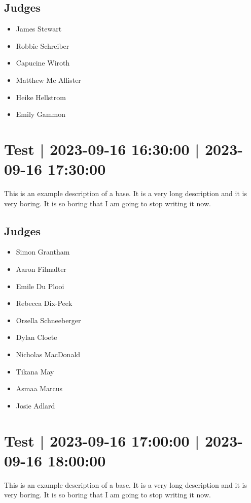 \documentclass[10pt]{article}
\begin{document}
	\subsection*{Judges}
	\begin{itemize}

			\item James Stewart
			\item Robbie Schreiber
			\item Capucine Wiroth
			\item Matthew Mc Allister
			\item Heike Hellstrom
			\item Emily Gammon
		\end{itemize}

			\setcounter{section}{16}
	\section{Test | 2023-09-16 16:30:00 | 2023-09-16 17:30:00}
	This is an example description of a base. It is a very long description and it is very boring. It is so boring that I am going to stop writing it now.

	\subsection*{Judges}
	\begin{itemize}

			\item Simon Grantham
			\item Aaron Filmalter
			\item Emile Du Plooi
			\item Rebecca Dix-Peek
			\item Orsella Schneeberger
			\item Dylan Cloete
			\item Nicholas MacDonald
			\item Tikana May
			\item Asmaa Marcus
			\item Josie Adlard
		\end{itemize}

			\setcounter{section}{17}
	\section{Test | 2023-09-16 17:00:00 | 2023-09-16 18:00:00}
	This is an example description of a base. It is a very long description and it is very boring. It is so boring that I am going to stop writing it now.
\end{document}
